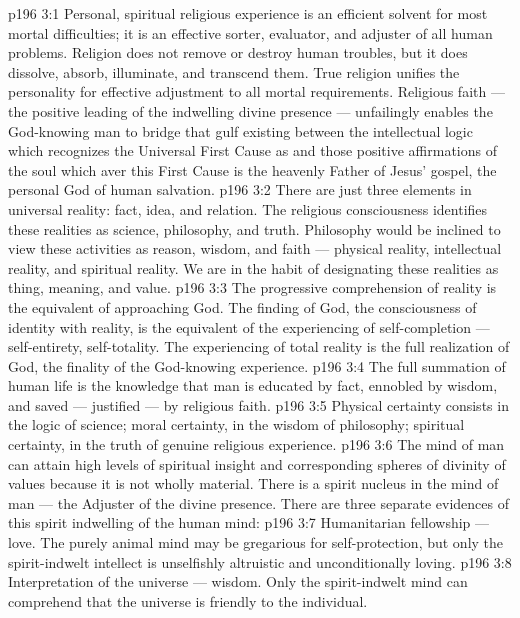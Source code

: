 \vs p196 3:1 Personal, spiritual religious experience is an efficient solvent for most mortal difficulties; it is an effective sorter, evaluator, and adjuster of all human problems. Religion does not remove or destroy human troubles, but it does dissolve, absorb, illuminate, and transcend them. True religion unifies the personality for effective adjustment to all mortal requirements. Religious faith --- the positive leading of the indwelling divine presence --- unfailingly enables the God\hyp{}knowing man to bridge that gulf existing between the intellectual logic which recognizes the Universal First Cause as  and those positive affirmations of the soul which aver this First Cause is  the heavenly Father of Jesus’ gospel, the personal God of human salvation.
\vs p196 3:2 There are just three elements in universal reality: fact, idea, and relation. The religious consciousness identifies these realities as science, philosophy, and truth. Philosophy would be inclined to view these activities as reason, wisdom, and faith --- physical reality, intellectual reality, and spiritual reality. We are in the habit of designating these realities as thing, meaning, and value.
\vs p196 3:3 The progressive comprehension of reality is the equivalent of approaching God. The finding of God, the consciousness of identity with reality, is the equivalent of the experiencing of self\hyp{}completion --- self\hyp{}entirety, self\hyp{}totality. The experiencing of total reality is the full realization of God, the finality of the God\hyp{}knowing experience.
\vs p196 3:4 The full summation of human life is the knowledge that man is educated by fact, ennobled by wisdom, and saved --- justified --- by religious faith.
\vs p196 3:5 Physical certainty consists in the logic of science; moral certainty, in the wisdom of philosophy; spiritual certainty, in the truth of genuine religious experience.
\vs p196 3:6 The mind of man can attain high levels of spiritual insight and corresponding spheres of divinity of values because it is not wholly material. There is a spirit nucleus in the mind of man --- the Adjuster of the divine presence. There are three separate evidences of this spirit indwelling of the human mind:
\vs p196 3:7 \bibnobreakspace Humanitarian fellowship --- love. The purely animal mind may be gregarious for self\hyp{}protection, but only the spirit\hyp{}indwelt intellect is unselfishly altruistic and unconditionally loving.
\vs p196 3:8 \bibnobreakspace Interpretation of the universe --- wisdom. Only the spirit\hyp{}indwelt mind can comprehend that the universe is friend\-ly to the individual.
